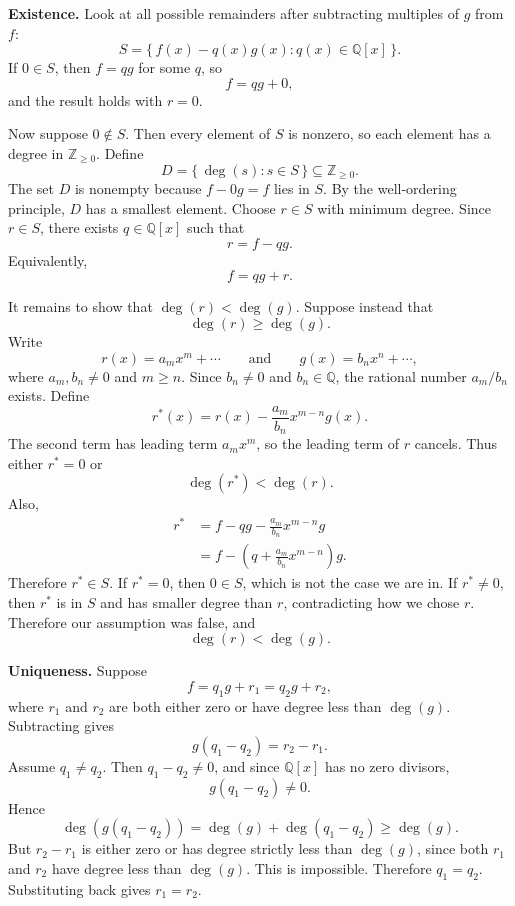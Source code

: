 \documentclass[12pt]{article}
\makeatletter
\theoremstyle{definition}
\newcommand{\Qx}{\mathbb{Q}[x]}
\renewenvironment{proof}[1][\proofname]{%
  \par\pushQED{\qed}%
  \normalfont \topsep6\p@\@plus6\p@\relax
  \trivlist
  \item[\hskip\labelsep\bfseries #1\@addpunct{.}]\ignorespaces
}{%
  \popQED\endtrivlist\@endpefalse
}
\makeatother
\begin{document}
\begin{proof}
\textbf{Existence.}
Look at all possible remainders after subtracting multiples of $g$ from $f$:
\[
S=\{\,f(x)-q(x)g(x):q(x)\in\Qx\,\}.
\]
If $0\in S$, then $f=qg$ for some $q$, so
\[
f=qg+0,
\]
and the result holds with $r=0$.

Now suppose $0\notin S$.  Then every element of $S$ is nonzero, so
each element has a degree in $\mathbb{Z}_{\geq0}$.  Define
\[
D=\{\,\deg(s):s\in S\,\}\subseteq\mathbb{Z}_{\geq0}.
\]
The set $D$ is nonempty because $f-0g=f$ lies in $S$.  By the well-ordering
principle, $D$ has a smallest element.  Choose $r\in S$ with minimum degree.
Since $r\in S$, there exists $q\in\Qx$ such that
\[
r=f-qg.
\]
Equivalently,
\[
f=qg+r.
\]

It remains to show that $\deg(r)<\deg(g)$.  Suppose instead that
\[
\deg(r)\geq\deg(g).
\]
Write
\[
r(x)=a_mx^m+\cdots
\qquad\text{and}\qquad
g(x)=b_nx^n+\cdots,
\]
where $a_m,b_n\neq0$ and $m\geq n$.  Since $b_n\neq0$ and $b_n\in\mathbb{Q}$,
the rational number $a_m/b_n$ exists.  Define
\[
r^*(x)=r(x)-\frac{a_m}{b_n}x^{m-n}g(x).
\]
The second term has leading term $a_mx^m$, so the leading term of $r$ cancels.
Thus either $r^*=0$ or
\[
\deg(r^*)<\deg(r).
\]
Also,
\[
\begin{aligned}
r^*
&=f-qg-\frac{a_m}{b_n}x^{m-n}g\\
&=f-\left(q+\frac{a_m}{b_n}x^{m-n}\right)g.
\end{aligned}
\]
Therefore $r^*\in S$.  If $r^*=0$, then $0\in S$, which is not the case we are
in.  If $r^*\neq0$, then $r^*$ is in $S$ and has smaller degree than $r$,
contradicting how we chose $r$.  Therefore our assumption was false, and
\[
\deg(r)<\deg(g).
\]

\textbf{Uniqueness.}
Suppose
\[
f=q_1g+r_1=q_2g+r_2,
\]
where $r_1$ and $r_2$ are both either zero or have degree less than $\deg(g)$.
Subtracting gives
\[
g(q_1-q_2)=r_2-r_1.
\]
Assume $q_1\neq q_2$.  Then $q_1-q_2\neq0$, and since $\Qx$ has no
zero divisors,
\[
g(q_1-q_2)\neq0.
\]
Hence
\[
\deg(g(q_1-q_2))=\deg(g)+\deg(q_1-q_2)\geq\deg(g).
\]
But $r_2-r_1$ is either zero or has degree strictly less than $\deg(g)$, since
both $r_1$ and $r_2$ have degree less than $\deg(g)$.  This is impossible.
Therefore $q_1=q_2$.  Substituting back gives $r_1=r_2$.
\end{proof}
\end{document}

